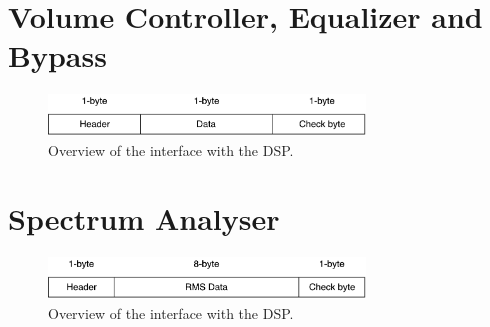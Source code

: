 \section{Volume Controller, Equalizer and Bypass}

\begin{figure}[H]
\centering
\includegraphics[width=0.75\textwidth]{figures/communicationProtocolUART.pdf}
\caption{Overview of the interface with the DSP.}
\label{fig:communicationProtocolUART}
\end{figure}

\section{Spectrum Analyser}

\begin{figure}[H]
\centering
\includegraphics[width=0.75\textwidth]{figures/communicationProtocolUARTTransmit.pdf}
\caption{Overview of the interface with the DSP.}
\label{fig:communicationProtocolUARTTransmit}
\end{figure}




